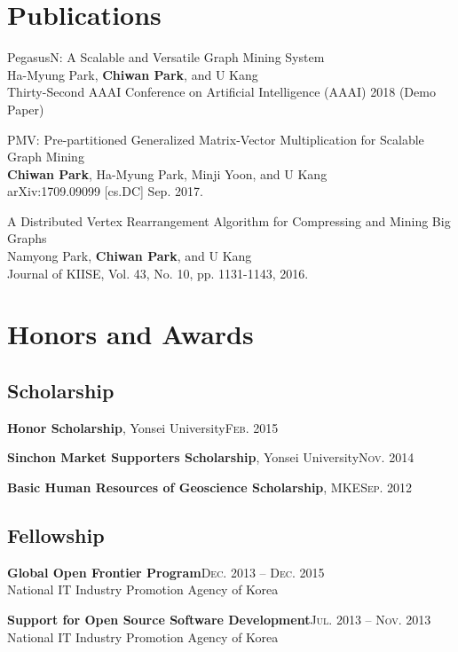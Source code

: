 \documentclass[11pt,a4paper]{article}
\renewenvironment{itemize}{
  \begin{list}{}{
    \setlength{\leftmargin}{1.5em}
    \setlength{\itemsep}{0.5em}
    \setlength{\parskip}{0pt}
    \setlength{\parsep}{0.25em}
  }
}{
  \end{list}
}
\begin{document}
\section*{Publications}
\begin{itemize}
  \item PegasusN: A Scalable and Versatile Graph Mining System\\
  Ha-Myung Park, \textbf{Chiwan Park}, and U Kang\\
  Thirty-Second AAAI Conference on Artificial Intelligence (AAAI) 2018 (Demo Paper)
  \item PMV: Pre-partitioned Generalized Matrix-Vector Multiplication for Scalable Graph Mining\\
  \textbf{Chiwan Park}, Ha-Myung Park, Minji Yoon, and U Kang\\
  arXiv:1709.09099 [cs.DC] Sep. 2017.
	\item A Distributed Vertex Rearrangement Algorithm for Compressing and Mining Big Graphs\\
	Namyong Park, \textbf{Chiwan Park}, and U Kang\\
	Journal of KIISE, Vol. 43, No. 10, pp. 1131-1143, 2016.
\end{itemize}

\section*{Honors and Awards}
\subsection*{Scholarship}
\begin{itemize}
	\setlength\itemsep{0.1em}
  \item \textbf{Honor Scholarship}, Yonsei University\hfill\textsc{Feb. 2015}
  \item \textbf{Sinchon Market Supporters Scholarship}, Yonsei University\hfill\textsc{Nov. 2014}
  \item \textbf{Basic Human Resources of Geoscience Scholarship}, MKE\hfill\textsc{Sep. 2012}
\end{itemize}
\subsection*{Fellowship}
\begin{itemize}
  \item \textbf{Global Open Frontier Program}\hfill\textsc{Dec. 2013 -- Dec. 2015}\\
        National IT Industry Promotion Agency of Korea
  \item \textbf{Support for Open Source Software Development}\hfill\textsc{Jul. 2013 -- Nov. 2013}\\
        National IT Industry Promotion Agency of Korea
\end{itemize}
\end{document}
